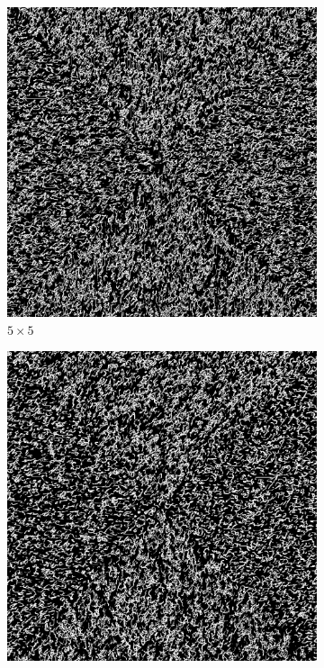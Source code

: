 \documentclass{article}
\begin{document}
\begin{figure}[H]
    \centering
    \begin{subfigure}{0.4\textwidth}
        \centering
        \includegraphics[width=\linewidth]{../Result/mnist-patch-5.png}
        \caption{$5 \times 5$}
        \label{fig:mnist-patch-5}
    \end{subfigure}
    \begin{subfigure}{0.4\textwidth}
        \centering
        \includegraphics[width=\linewidth]{../Result/mnist-patch-7.png}

\end{subfigure}
\end{figure}
\end{document}
